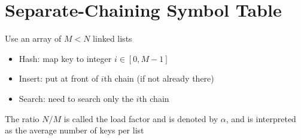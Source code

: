 \documentclass[8pt,a4paper,compress]{beamer}
\begin{document}
\section{Separate-Chaining Symbol Table}
\begin{frame}[fragile]
\pause

Use an array of $M < N$ linked lists
\begin{itemize}
\item Hash: map key to integer $i \in [0, M - 1]$

\item Insert: put at front of $i$th chain (if not already there)

\item Search: need to search only the $i$th chain
\end{itemize}

\begin{center}
\end{center}

\pause
\bigskip

The ratio $N / M$ is called the load factor and is denoted by $\alpha$, and is interpreted as the average number of keys per list
\end{frame}
\end{document}
